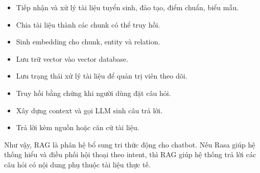 \begin{itemize}
    \item Tiếp nhận và xử lý tài liệu tuyển sinh, đào tạo, điểm chuẩn, biểu mẫu.
    \item Chia tài liệu thành các chunk có thể truy hồi.
    \item Sinh embedding cho chunk, entity và relation.
    \item Lưu trữ vector vào vector database.
    \item Lưu trạng thái xử lý tài liệu để quản trị viên theo dõi.
    \item Truy hồi bằng chứng khi người dùng đặt câu hỏi.
    \item Xây dựng context và gọi LLM sinh câu trả lời.
    \item Trả lời kèm nguồn hoặc căn cứ tài liệu.
\end{itemize}

Như vậy, RAG là phân hệ bổ sung tri thức động cho chatbot. Nếu Rasa giúp hệ thống hiểu và điều phối hội thoại theo intent, thì RAG giúp hệ thống trả lời các câu hỏi có nội dung phụ thuộc tài liệu thực tế.
